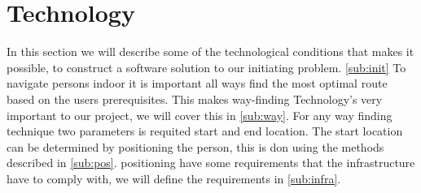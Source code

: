 
\section{Technology}

In this section we will describe some of the technological conditions that makes it possible, to construct a software solution to our initiating problem. \cref{sub:init} 
To navigate persons indoor it is important all ways find the most optimal route based on the users prerequisites. This makes way-finding Technology's very important to our project, we will cover this in \cref{sub:way}. For any way finding technique two parameters is requited start and end location. The start location can be determined by positioning the person, this is don using the methods described in \cref{sub:pos}.
positioning have some requirements that the infrastructure have to comply with, we will define the requirements in \cref{sub:infra}. 



 


